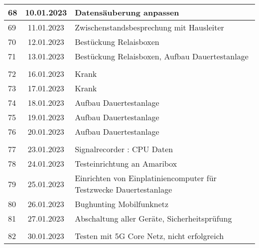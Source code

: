 \begin{longtable}{|l|c|l|}
68  & 10.01.2023    &  Datensäuberung anpassen                                                    \\ \hline 
69  & 11.01.2023    &  Zwischenstandsbesprechung mit Hausleiter                                                      \\ \hline 
70  & 12.01.2023    &  Bestückung Relaisboxen                                                     \\ \hline 
71  & 13.01.2023    &  Bestückung Relaisboxen, Aufbau Dauertestanlage                                                     \\ \hline 
&               &                                                       \\ \hline 
72  & 16.01.2023    & Krank                                                      \\ \hline 
73  & 17.01.2023    & Krank                                                      \\ \hline 
74  & 18.01.2023    & Aufbau Dauertestanlage                                                      \\ \hline 
75  & 19.01.2023    & Aufbau Dauertestanlage                                                        \\ \hline 
76  & 20.01.2023    & Aufbau Dauertestanlage                                                       \\ \hline
&               &                                                       \\ \hline  
77  & 23.01.2023    &  Signalrecorder : CPU Daten                                                     \\ \hline 
78  & 24.01.2023    &  Testeinrichtung an Amaribox                                                     \\ \hline 
79  & 25.01.2023    &  Einrichten von Einplatiniencomputer für Testzwecke Dauertestanlage                                                      \\ \hline 
80  & 26.01.2023    &  Bughunting \q{spezielles} Mobilfunknetz                                                     \\ \hline 
81  & 27.01.2023    &  Abschaltung aller Geräte, Sicherheitsprüfung                                                     \\ \hline
&               &                                                       \\ \hline  
82  & 30.01.2023    &  Testen mit 5G Core Netz, nicht erfolgreich                                                     \\ \hline 

\end{longtable}
